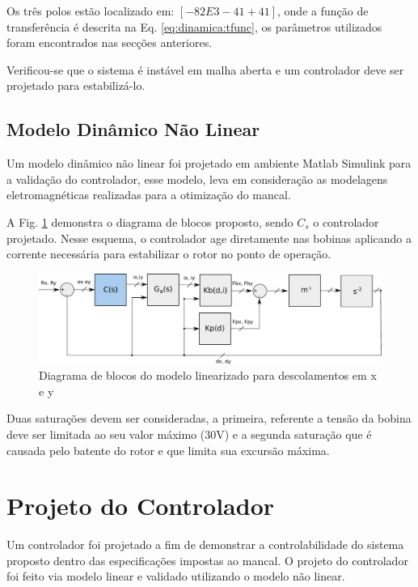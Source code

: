 Os três polos estão localizado em: $[-82E3 -41 +41]	$, onde a função de transferência é descrita na Eq. \eqref{eq:dinamica:tfunc}, os parâmetros utilizados foram encontrados nas secções anteriores. 

Verificou-se que o sistema é instável em malha aberta e um controlador deve ser projetado para estabilizá-lo. 

\subsection{Modelo Dinâmico Não Linear}

Um modelo dinâmico não linear foi projetado em ambiente Matlab Simulink para a validação do controlador, esse modelo, leva em consideração as modelagens eletromagnéticas realizadas para a otimização do mancal.

A Fig. \ref{fig:diagrama:blocos:modelo:linear} demonstra o diagrama de blocos proposto, sendo $C_s$ o controlador projetado. Nesse esquema, o controlador age diretamente nas bobinas aplicando a corrente necessária para estabilizar o rotor no ponto de operação. 

\begin{figure}[th!]
	\centering
	\includegraphics[width=1\linewidth]{../Figs/Modelagem/diagrama_blocos_modelo_linear}
	\caption{Diagrama de blocos do modelo linearizado para descolamentos em x e y}
	\label{fig:diagrama:blocos:modelo:linear}
\end{figure}

Duas saturações devem ser consideradas, a primeira, referente a tensão da bobina deve ser limitada ao seu valor máximo (30V) e a segunda saturação que é causada pelo batente do rotor e que limita sua excursão máxima.

\section{Projeto do Controlador}

Um controlador foi projetado a fim de demonstrar a controlabilidade do sistema proposto dentro das especificações impostas ao mancal. O projeto do controlador foi feito via modelo linear e validado utilizando o modelo não linear. 

